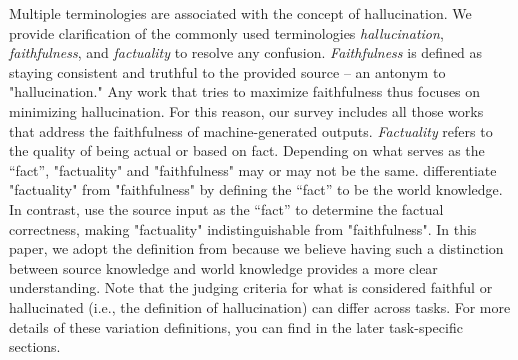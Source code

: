 \label{subsec:terminology}
Multiple terminologies are associated with the concept of hallucination. We provide clarification of the commonly used terminologies \textit{hallucination}, \textit{faithfulness}, and \textit{factuality} to resolve any confusion. 
\textit{Faithfulness} is defined as staying consistent and truthful to the provided source -- an antonym to "hallucination." Any work that tries to maximize faithfulness thus focuses on minimizing hallucination. For this reason, our survey includes all those works that address the faithfulness of machine-generated outputs. 
\textit{Factuality} refers to the quality of being actual or based on fact. Depending on what serves as the ``fact'', "factuality" and "faithfulness" may or may not be the same.  differentiate "factuality" from "faithfulness" by defining the ``fact'' to be the world knowledge.
In contrast,  use the source input as the ``fact'' to determine the factual correctness, making "factuality" indistinguishable from "faithfulness". 
In this paper, we adopt the definition from  because we believe having such a distinction between source knowledge and world knowledge provides a more clear understanding. 
Note that the judging criteria for what is considered faithful or hallucinated (i.e., the definition of hallucination) can differ across tasks. For more details of these variation definitions, you can find in the later task-specific sections.
